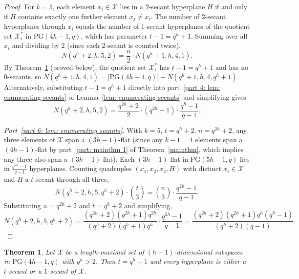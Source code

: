 \documentclass[12pt, twoside]{article}
\newtheorem{theorem}{\bf Theorem}%
\begin{document}
\begin{proof}
		For $k=5$, each element $x_i \in \mathcal{X}$ lies in a $2$-secant hyperplane $H$ if and only if $H$ contains exactly one further element $x_j \ne x_i$. The number of $2$-secant hyperplanes through $x_i$ equals the number of $1$-secant hyperplanes of the quotient set $\mathcal{X}_i^*$ in $\mathrm{PG}(4h-1,q)$, which has parameter $t-1=q^h+1$. Summing over all $x_i$ and dividing by $2$ (since each $2$-secant is counted twice),
		$$
		N(q^h+2,h,5,2) = \frac{n}{2}\cdot N(q^h+1,h,4,1).
		$$
		By Theorem~\ref{lem: k=4 maximal arc DNE} (proved below), the quotient set $\mathcal{X}_i^*$ has $t-1=q^h+1$ and has no $0$-secants, so $N(q^h+1,h,4,1) = |\mathrm{PG}(4h-1,q)| - N(q^h+1,h,4,q^h+1)$. Alternatively, substituting $t-1=q^h+1$ directly into part~\ref{part 4: lem: enumerating secants} of Lemma~\ref{lem: enumerating secants} and simplifying gives
		$$
		N(q^h+2,h,5,2) = \frac{q^{2h}+2}{2}\cdot (q^{2h}+1)\cdot\frac{q^h-1}{q-1}.
		$$
		
		\medskip\noindent\textit{Part~\ref{part 6: lem: enumerating secants}.}
		With $k=5$, $t=q^h+2$, $n=q^{2h}+2$, any three elements of $\mathcal{X}$ span a $(3h-1)$-flat (since any $k-1=4$ elements span a $(4h-1)$-flat by part~\ref{part: mainthm 1} of Theorem~\ref{mainthm}, which implies any three also span a $(3h-1)$-flat). Each $(3h-1)$-flat in $\mathrm{PG}(5h-1,q)$ lies in $\frac{q^{2h}-1}{q-1}$ hyperplanes. Counting quadruples $(x_1,x_2,x_3,H)$ with distinct $x_i \in \mathcal{X}$ and $H$ a $t$-secant through all three,
		$$
		N(q^h+2,h,5,q^h+2)\cdot \binom{t}{3} = \binom{n}{3}\cdot\frac{q^{2h}-1}{q-1}.
		$$
		Substituting $n=q^{2h}+2$ and $t=q^h+2$ and simplifying,
		$$
		N(q^h+2,h,5,q^h+2) = \frac{(q^{2h}+2)(q^{2h}+1)q^{2h}}{(q^h+2)(q^h+1)q^h}\cdot\frac{q^{2h}-1}{q-1} = \frac{(q^{2h}+2)(q^{2h}+1)q^h(q^h-1)}{(q^h+2)(q-1)}.
		$$
	\end{proof}
	
	\begin{theorem}\label{lem: k=4 maximal arc DNE}
		Let $\mathcal{X}$ be a length-maximal set of $(h-1)$-dimensional subspaces in $\mathrm{PG}(4h-1, q)$ with $q^h > 2$. Then $t=q^h+1$ and every hyperplane is either a $t$-secant or a $1$-secant of $\mathcal{X}$.
	\end{theorem}
	
\end{document}

